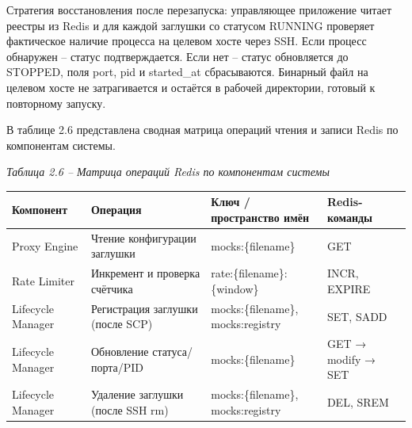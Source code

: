 \documentclass[
]{article}
\newcounter{none} %
\begin{document}
Стратегия восстановления после перезапуска: управляющее приложение
читает реестры из Redis и для каждой заглушки со статусом RUNNING
проверяет фактическое наличие процесса на целевом хосте через SSH. Если
процесс обнаружен -- статус подтверждается. Если нет -- статус
обновляется до STOPPED, поля port, pid и started\_at сбрасываются.
Бинарный файл на целевом хосте не затрагивается и остаётся в рабочей
директории, готовый к повторному запуску.

В таблице 2.6 представлена сводная матрица операций чтения и записи
Redis по компонентам системы.

\emph{Таблица 2.6 -- Матрица операций Redis по компонентам системы}

{\def\LTcaptype{none} %
\begin{longtable}[]{@{}
  >{\raggedright\arraybackslash}p{}
  >{\raggedright\arraybackslash}p{}
  >{\raggedright\arraybackslash}p{}
  >{\raggedright\arraybackslash}p{}@{}}
\toprule\noalign{}
\begin{minipage}[b]{\linewidth}\centering
\textbf{Компонент}
\end{minipage} & \begin{minipage}[b]{\linewidth}\centering
\textbf{Операция}
\end{minipage} & \begin{minipage}[b]{\linewidth}\centering
\textbf{Ключ / пространство имён}
\end{minipage} & \begin{minipage}[b]{\linewidth}\centering
\textbf{Redis-команды}
\end{minipage} \\
\midrule\noalign{}
\endhead
\bottomrule\noalign{}
\endlastfoot
Proxy Engine & Чтение конфигурации заглушки & mocks:\{filename\} &
GET \\
Rate Limiter & Инкремент и проверка счётчика &
rate:\{filename\}:\{window\} & INCR, EXPIRE \\
Lifecycle Manager & Регистрация заглушки (после SCP) &
mocks:\{filename\}, mocks:registry & SET, SADD \\
Lifecycle Manager & Обновление статуса/порта/PID & mocks:\{filename\} &
GET → modify → SET \\
Lifecycle Manager & Удаление заглушки (после SSH rm) &
mocks:\{filename\}, mocks:registry & DEL, SREM \\

\end{longtable}}
\end{document}
